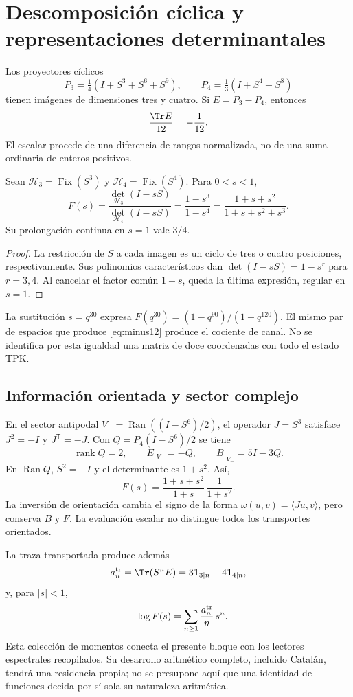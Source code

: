 \section{Descomposición cíclica y representaciones determinantales}
Los proyectores cíclicos
\[
P_3=\tfrac14(I+S^3+S^6+S^9),\qquad
P_4=\tfrac13(I+S^4+S^8)
\]
tienen imágenes de dimensiones tres y cuatro. Si $E=P_3-P_4$, entonces
\begin{equation}
\frac{\Tr E}{12}=-\frac1{12}.
\label{eq:minus12}
\end{equation}
El escalar procede de una diferencia de rangos normalizada, no de una
suma ordinaria de enteros positivos.

\begin{theorem}
Sean $\mathcal H_3=\operatorname{Fix}(S^3)$ y
$\mathcal H_4=\operatorname{Fix}(S^4)$. Para $0<s<1$,
\begin{equation}
F(s)=\frac{\det_{\mathcal H_3}(I-sS)}{\det_{\mathcal H_4}(I-sS)}
=\frac{1-s^3}{1-s^4}
=\frac{1+s+s^2}{1+s+s^2+s^3}.
\label{eq:det}
\end{equation}
Su prolongación continua en $s=1$ vale $3/4$.
\end{theorem}
\begin{proof}
La restricción de $S$ a cada imagen es un ciclo de tres o cuatro
posiciones, respectivamente. Sus polinomios característicos dan
$\det(I-sS)=1-s^r$ para $r=3,4$. Al cancelar el factor común $1-s$,
queda la última expresión, regular en $s=1$.
\end{proof}

La sustitución $s=q^{30}$ expresa
$F(q^{30})=(1-q^{90})/(1-q^{120})$.
El mismo par de espacios que produce \eqref{eq:minus12}
produce el cociente de canal. No se identifica por esta igualdad
una matriz de doce coordenadas con todo el estado TPK.

\subsection{Información orientada y sector complejo}
En el sector antipodal $V_-=\operatorname{Ran}((I-S^6)/2)$,
el operador $J=S^3$ satisface $J^2=-I$ y $J^{\mathsf T}=-J$.
Con $Q=P_4(I-S^6)/2$ se tiene
\[
\operatorname{rank}Q=2,\qquad E|_{V_-}=-Q,\qquad B|_{V_-}=5I-3Q.
\]
En $\operatorname{Ran}Q$, $S^2=-I$ y el determinante es $1+s^2$.
Así,
\[
F(s)=\frac{1+s+s^2}{1+s}\,\frac1{1+s^2}.
\]
La inversión de orientación cambia el signo de la forma
$\omega(u,v)=\langle Ju,v\rangle$, pero conserva $B$ y $F$.
La evaluación escalar no distingue todos los transportes orientados.

La traza transportada produce además
\[
a_n^{\rm tr}=\Tr(S^nE)=3\mathbf1_{3\mid n}-4\mathbf1_{4\mid n},
\]
y, para $|s|<1$,
\[
-\log F(s)=\sum_{n\ge1}\frac{a_n^{\rm tr}}n\,s^n.
\]
Esta colección de momentos conecta el presente bloque con los lectores
espectrales recopilados. Su desarrollo aritmético completo, incluido
Catalán, tendrá una residencia propia; no se presupone aquí que una
identidad de funciones decida por sí sola su naturaleza aritmética.
